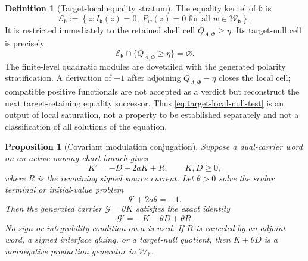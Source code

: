 \documentclass[11pt]{article}
\numberwithin{section}{part}
\theoremstyle{plain}
\newtheorem{proposition}[proposition]{Proposition}
\theoremstyle{definition}
\newtheorem{definition}[definition]{Definition}
\theoremstyle{remark}
\begin{document}
\begin{definition}[Target-local equality stratum]
\label{def:target-local-equality-kernel}
The equality kernel of \(\mathfrak b\) is
\begin{equation}
 \label{eq:target-local-equality-kernel}
 \mathcal E_{\mathfrak b}
 :=\left\{z: I_{\mathfrak b}(z)=0,
                   \ P_w(z)=0\text{ for all }
                   w\in\mathscr W_{\mathfrak b}\right\}.
\end{equation}
It is restricted immediately to the retained shell cell
\(Q_{A,\Phi}\ge\eta\).  Its target-null cell is precisely
\begin{equation}
 \label{eq:target-local-null-test}
 \mathcal E_{\mathfrak b}\cap\{Q_{A,\Phi}\ge\eta\}=\varnothing.
\end{equation}
The finite-level quadratic modules are dovetailed with the generated polarity
stratification.  A derivation of \(-1\) after adjoining
\(Q_{A,\Phi}-\eta\) closes the local cell; compatible positive functionals
are not accepted as a verdict but reconstruct the next target-retaining
equality successor.  Thus \eqref{eq:target-local-null-test} is an output of
local saturation, not a property to be established separately and not a
classification of all solutions of the equation.
\end{definition}

\begin{proposition}[Covariant modulation conjugation]
\label{prop:covariant-modulation-conjugation}
Suppose a dual-carrier word on an active moving-chart branch gives
\begin{equation}
 \label{eq:abstract-modulated-carrier}
 K'=-D+2aK+R,
 \qquad K,D\ge0,
\end{equation}
where \(R\) is the remaining signed source current.  Let \(\theta>0\) solve
the scalar terminal or initial-value problem
\begin{equation}
 \label{eq:abstract-covariant-scale}
 \theta'+2a\theta=-1.
\end{equation}
Then the generated carrier \(\mathcal G=\theta K\) satisfies the exact
identity
\begin{equation}
 \label{eq:abstract-conjugated-carrier}
 \mathcal G'=-K-\theta D+\theta R.
\end{equation}
No sign or integrability condition on \(a\) is used.  If \(R\) is canceled by
an adjoint word, a signed interface gluing, or a target-null quotient, then
\(K+\theta D\) is a nonnegative production generator in
\(\mathscr W_{\mathfrak b}\).
\end{proposition}
\end{document}
